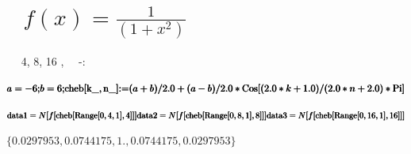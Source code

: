 \documentclass{article}
\newcommand{\unicode}[1]{{}}
\begin{document}
\section*{$\unicode{0418}\unicode{043d}\unicode{0442}\unicode{0435}\unicode{0440}\unicode{043f}\unicode{043e}\unicode{043b}\unicode{044f}\unicode{0446}\unicode{0438}\unicode{044f}$
$\unicode{0444}\unicode{0443}\unicode{043d}\unicode{043a}\unicode{0446}\unicode{0438}\unicode{0438}$ \(f(x)=\frac{1}{\left(1+x^2\right)}\) $\unicode{043d}\unicode{0430}$
$\unicode{0427}\unicode{0435}\unicode{0431}\unicode{044b}\unicode{0448}\unicode{0435}\unicode{0432}\unicode{0441}\unicode{043a}\unicode{043e}\unicode{0439}$
$\unicode{0441}\unicode{0435}\unicode{0442}\unicode{043a}\unicode{0435}$}

$\unicode{0421}\unicode{043d}\unicode{043e}\unicode{0432}\unicode{0430}$ $\unicode{0440}\unicode{0430}\unicode{0437}\unicode{043e}\unicode{0431}\unicode{044c}\unicode{0435}\unicode{043c}$
$\unicode{043f}\unicode{0440}\unicode{043e}\unicode{043c}\unicode{0435}\unicode{0436}\unicode{0443}\unicode{0442}\unicode{043e}\unicode{043a}$ $\unicode{043d}\unicode{0430}$
4, 8, 16 $\unicode{0438}\unicode{043d}\unicode{0442}\unicode{0435}\unicode{0440}\unicode{0432}\unicode{0430}\unicode{043b}\unicode{043e}\unicode{0432}$,
$\unicode{043d}\unicode{0430}$ $\unicode{044d}\unicode{0442}\unicode{043e}\unicode{0442}$ $\unicode{0440}\unicode{0430}\unicode{0437}$ $\unicode{043f}\unicode{043e}$-$\unicode{0447}\unicode{0435}\unicode{0431}\unicode{044b}\unicode{0448}\unicode{0435}\unicode{0432}\unicode{0441}\unicode{043a}\unicode{0438}$:

\begin{doublespace}
\noindent\(\pmb{a = -6;}\\
\pmb{b = 6;}\\
\pmb{\text{cheb}[\text{k$\_$}, \text{n$\_$}] \text{:=}(a+b)/2.0+(a-b)/2.0*\text{Cos}[(2.0*k+1.0)/(2.0*n+2.0)*\text{Pi}]}\)
\end{doublespace}

\begin{doublespace}
\noindent\(\pmb{\text{data1} = N[f[\text{cheb}[\text{Range}[0, 4, 1],4]]]}\\
\pmb{\text{data2} = N[f[\text{cheb}[\text{Range}[0, 8, 1],8]]]}\\
\pmb{\text{data3} = N[f[\text{cheb}[\text{Range}[0, 16, 1],16]]]}\)
\end{doublespace}

\begin{doublespace}
\noindent\(\{0.0297953,0.0744175,1.,0.0744175,0.0297953\}\)
\end{doublespace}
\end{document}
